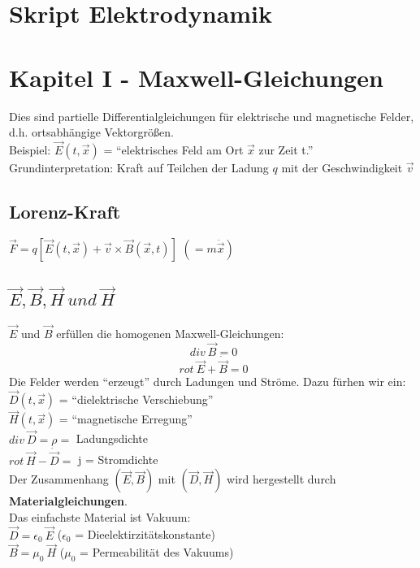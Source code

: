 \documentclass{article}
\begin{document}
\section*{Skript Elektrodynamik}



\section{Kapitel I - Maxwell-Gleichungen}

Dies sind partielle Differentialgleichungen für elektrische und magnetische Felder, d.h. ortsabhängige Vektorgrößen. \\ 
Beispiel: $\vec E(t, \vec x)$ = ``elektrisches Feld am Ort $\vec x$ zur Zeit t.''\\
Grundinterpretation: Kraft auf Teilchen der Ladung $q$ mit der Geschwindigkeit $\vec v$\\

\subsection{Lorenz-Kraft}
$\vec F = q[\vec E(t, \vec x) + \vec v \times \vec B(\vec x, t)]$ $(=m  \ddot{\vec x}) $

\subsection{$\vec E, \vec B, \vec H ~ und ~ \vec H$}
$\vec E$ und $\vec B$ erfüllen die homogenen Maxwell-Gleichungen:\\
$$div ~ \vec B = 0$$
$$rot ~ \vec E + \dot{\vec B} = 0$$
Die Felder werden ``erzeugt'' durch Ladungen und Ströme. Dazu fürhen wir ein: \\
$\vec D(t, \vec x)$ = ``dielektrische Verschiebung''\\
$\vec H(t, \vec x)$ = ``magnetische Erregung''\\
$div ~ \vec D = \rho = $ Ladungsdichte\\
$rot ~ \vec H - \dot{\vec D} = $ j = Stromdichte\\
Der Zusammenhang $(\vec E, \vec B)$ mit $(\vec D, \vec H)$ wird hergestellt durch \textbf{Materialgleichungen}.\\
Das einfachste Material ist Vakuum:\\
$\vec D = \epsilon_0 ~ \vec E$ ($\epsilon_0$ = Dieelektirzitätskonstante) \\ 
$\vec B = \mu_0 ~ \vec H$ ($\mu_0$ = Permeabilität des Vakuums) \\
\end{document}
